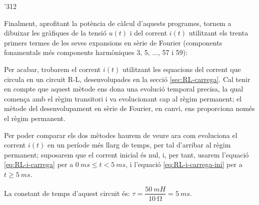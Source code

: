 \begin{exemple}
\begin{dingautolist}{'312}
    \end{dingautolist}

    Finalment, aprofitant la potència de càlcul d'aquests programes, tornem a dibuixar les gràfiques de la tensió $u(t)$ i del corrent $i(t)$ utilitzant els trenta primers termes de les seves expansions en sèrie de Fourier (components fonamentals més components harmòniques 3, 5, ..., 57 i 59):
    \vspace{-2mm}
    \begin{center}
      
    \end{center}

    Per acabar, trobarem el corrent $i(t)$ utilitzant les equacions del corrent que circula en un circuit R-L, desenvolupades en la secció \vref{sec:RL-carrega}. Cal tenir en compte que aquest mètode ens dona una evolució temporal precisa, la qual comença amb el règim transitori i va evolucionant cap al règim permanent; el mètode del desenvolupament en sèrie de Fourier, en canvi, ens proporciona només el règim permanent.

    Per  poder comparar els dos mètodes haurem de veure  ara com evoluciona el corrent $i(t)$ en un període més llarg de temps, per tal d'arribar al règim permanent; suposarem que el corrent inicial és nul, i, per tant, usarem l'equació \eqref{eq:RL-i-carrega} per a $\qty{0}{ms} \leq t < \qty{5}{ms}$, i l'equació \eqref{eq:RL-i-carrega-ini} per a $t \geq \qty{5}{ms}$.

    La constant de temps d'aquest circuit és: $\tau = \dfrac{\qty{50}{mH}}{\qty{10}{\ohm}} = \qty{5}{ms}$.



\end{exemple}
